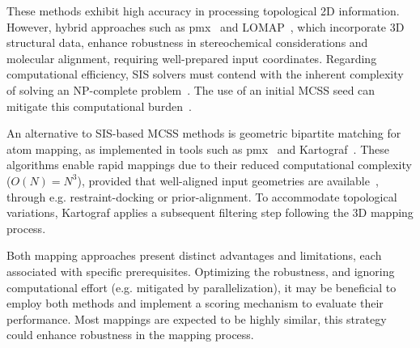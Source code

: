\documentclass[9pt,bestpractices,pubversion]{livecoms}
\begin{document}
These methods exhibit high accuracy in processing topological 2D information. However, hybrid approaches such as pmx~\cite{gapsys2015pmx} and LOMAP~\cite{liu2013lead}, which incorporate 3D structural data, enhance robustness in stereochemical considerations and molecular alignment, requiring well-prepared input coordinates. Regarding computational efficiency, SIS solvers must contend with the inherent complexity of solving an NP-complete problem~\cite{raymond2002maximum, Duesbury2018Comparison}. The use of an initial MCSS seed can mitigate this computational burden~\cite{raymond2002maximum}.

An alternative to SIS-based MCSS methods is geometric bipartite matching for atom mapping, as implemented in tools such as pmx~\cite{gapsys2015pmx} and Kartograf~\cite{ries2024kartograf}. These algorithms enable rapid mappings due to their reduced computational complexity ($O(N) = N^3$), provided that well-aligned input geometries are available~\cite{ries2024kartograf}, through e.g. restraint-docking or prior-alignment. To accommodate topological variations, Kartograf applies a subsequent filtering step following the 3D mapping process.

Both mapping approaches present distinct advantages and limitations, each associated with specific prerequisites. Optimizing the robustness, and ignoring computational effort (e.g. mitigated by parallelization), it may be beneficial to employ both methods and implement a scoring mechanism to evaluate their performance. Most mappings are expected to be highly similar, this strategy could enhance robustness in the mapping process.
\end{document}
